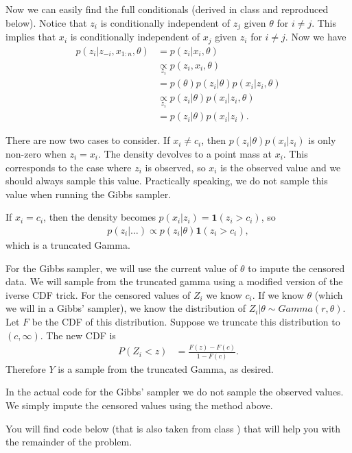 \documentclass[
]{article}
\begin{document}
Now we can easily find the full conditionals (derived in class and
reproduced below). Notice that \(z_i\) is conditionally independent of
\(z_j\) given \(\theta\) for \(i \neq j\). This implies that \(x_i\) is
conditionally independent of \(x_j\) given \(z_i\) for \(i \neq j\). Now
we have \begin{align*}
p(z_i|z_{-i},x_{1:n},\theta) &= p(z_i|x_i,\theta) \\
&\underset{z_i}{\propto} p(z_i,x_i,\theta) \\
&= p(\theta)p(z_i|\theta)p(x_i|z_i,\theta) \\
&\underset{z_i}{\propto} p(z_i|\theta)p(x_i|z_i,\theta) \\
&= p(z_i|\theta)p(x_i|z_i).
\end{align*}

There are now two cases to consider. If \(x_i \neq c_i\), then
\(p(z_i|\theta)p(x_i|z_i)\) is only non-zero when \(z_i = x_i\). The
density devolves to a point mass at \(x_i\). This corresponds to the
case where \(z_i\) is observed, so \(x_i\) is the observed value and we
should always sample this value. Practically speaking, we do not sample
this value when running the Gibbs sampler.

If \(x_i = c_i\), then the density becomes
\(p(x_i|z_i) = \bm{1}(z_i > c_i)\), so \begin{align*}
p(z_i|\hdots) \propto p(z_i|\theta)\bm{1}(z_i>c_i),
\end{align*} which is a truncated Gamma.

For the Gibbs sampler, we will use the current value of \(\theta\) to
impute the censored data. We will sample from the truncated gamma using
a modified version of the iverse CDF trick. For the censored values of
\(Z_i\) we know \(c_i\). If we know \(\theta\) (which we will in a
Gibbs' sampler), we know the distribution of
\(Z_i|\theta \sim Gamma(r,\theta)\). Let \(F\) be the CDF of this
distribution. Suppose we truncate this distribution to \((c,\infty)\).
The new CDF is \begin{align*}
P(Z_i < z) &= \frac{F(z) - F(c)}{1 - F(c)}.
\end{align*} Therefore \(Y\) is a sample from the truncated Gamma, as
desired.

In the actual code for the Gibbs' sampler we do not sample the observed
values. We simply impute the censored values using the method above.

You will find code below (that is also taken from class ) that will help
you with the remainder of the problem.
\end{document}
